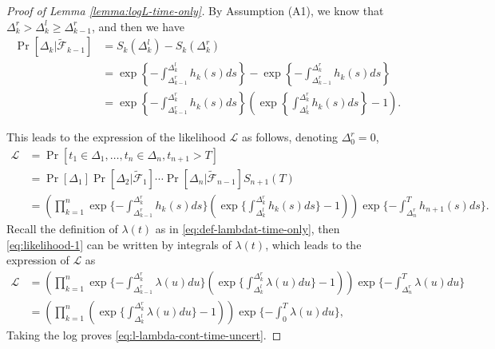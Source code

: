 \documentclass[11pt]{article}
\newcommand{\tn}[1]{\textcolor{purple}{\textsf{TG: #1}}}
\theoremstyle{remark}
\theoremstyle{plain}
\newcommand{\calL}{\mathcal{L}}
\newcommand{\calF}{\mathcal{F}}
\begin{document}
%
\begin{proof}[Proof of Lemma \ref{lemma:logL-time-only}]
By Assumption (A1), we know that $\Delta_k^r > \Delta_k^l \ge \Delta_{k-1}^r$, and then we have
\begin{align}
\Pr[ \Delta_k | \tilde{\calF}_{k-1} ] 
&= S_k (\Delta_k^l) - S_k( \Delta_k^r ) \nonumber  \\
&= \exp \left\{ - \int_{\Delta_{k-1}^r}^{\Delta_k^l} h_k(s) ds \right\}
 - \exp \left\{ - \int_{\Delta_{k-1}^r}^{\Delta_k^r} h_k(s) ds \right\} \nonumber  \\
& =  \exp\left\{ - \int_{\Delta_{k-1}^r}^{\Delta_k^r} h_k(s) ds \right\} 
  \left( \exp\left\{ \int_{\Delta_{k}^l}^{\Delta_k^r} h_k(s) ds\right\}  - 1 \right). \label{eq:Pr-Deltak-time-only}
\end{align}

This leads to the expression of the likelihood $\calL$ as follows, denoting $\Delta_{0}^r = 0$,
\begin{align}
\calL 
& = \Pr[ t_1\in\Delta_1, \ldots, t_n \in \Delta_n, t_{n+1} > T ] \\
& = \Pr[ \Delta_1  ]   
    \Pr[ \Delta_2 | \tilde{\calF}_{1}  ]
    \cdots 
    \Pr[ \Delta_n | \tilde{\calF}_{n-1}  ]
    S_{n+1}(T) \nonumber \\
& =
 \left(\prod_{k=1}^n
  \exp\{ - \int_{\Delta_{k-1}^r}^{\Delta_k^r} h_k(s) ds \} 
  \left( \exp\{ \int_{\Delta_{k}^l}^{\Delta_{k}^r} h_k(s) ds\}  - 1 \right) \right)     
  \exp\{ - \int_{\Delta_{n}^r}^T h_{n+1}(s) ds \}.
    \label{eq:likelihood-1}
\end{align}
Recall the definition of $\lambda(t)$ as in \eqref{eq:def-lambdat-time-only},
then \eqref{eq:likelihood-1} can be written by integrals of $\lambda(t)$, which leads to the expression of  $\calL$ as
\begin{align*}
\calL
& =  \left(\prod_{k=1}^n
  \exp\{ - \int_{\Delta_{k-1}^r}^{\Delta_k^r}  \lambda(u) du \} 
  \left( \exp\{ \int_{\Delta_{k}^l}^{\Delta_{k}^r}  \lambda(u) du\}  - 1 \right) \right)     
  \exp\{ - \int_{\Delta_{n}^r}^T \lambda(u) du \} \nonumber \\
& = \left(  \prod_{k=1}^n
  \left( \exp\{ \int_{\Delta_{k}^l}^{\Delta_{k}^r}  \lambda(u) du\}  - 1 \right) \right) 
  \exp\{ - \int_{0}^{T}  \lambda(u) du \},
\end{align*}
Taking the log proves \eqref{eq:l-lambda-cont-time-uncert}.
\end{proof}
\end{document}
